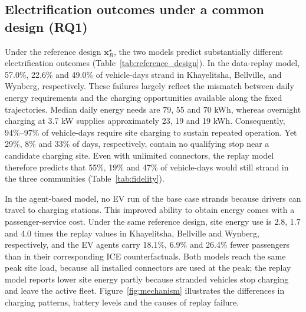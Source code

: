 \documentclass{elsarticle}
\newcommand{\xR}{\ensuremath{\mathbf{x}_R^{\star}}}
\begin{document}
\subsection{Electrification outcomes under a common design (RQ1)}
\label{sec:results_rq1}

Under the reference design \(\xR\), the two models predict substantially different electrification outcomes (Table~\ref{tab:reference_design}). In the data-replay model, 57.0\%, 22.6\% and 49.0\% of vehicle-days strand in Khayelitsha, Bellville, and Wynberg, respectively. These failures largely reflect the mismatch between daily energy requirements and the charging opportunities available along the fixed trajectories. Median daily energy needs are 79, 55 and 70 kWh, whereas overnight charging at 3.7 kW supplies approximately 23, 19 and 19 kWh. Consequently, 94\%--97\% of vehicle-days require site charging to sustain repeated operation. Yet 29\%, 8\% and 33\% of days, respectively, contain no qualifying stop near a candidate charging site. Even with unlimited connectors, the replay model therefore predicts that 55\%, 19\% and 47\% of vehicle-days would still strand in the three communities (Table~\ref{tab:fidelity}).

In the agent-based model, no EV run of the base case strands because drivers can travel to charging stations. This improved ability to obtain energy comes with a passenger-service cost. Under the same reference design, site energy use is 2.8, 1.7 and 4.0 times the replay values in Khayelitsha, Bellville and Wynberg, respectively, and the EV agents carry 18.1\%, 6.9\% and 26.4\% fewer passengers than in their corresponding ICE counterfactuals. Both models reach the same peak site load, because all installed connectors are used at the peak; the replay model reports lower site energy partly because stranded vehicles stop charging and leave the active fleet. Figure~\ref{fig:mechanism} illustrates the differences in charging patterns, battery levels and the causes of replay failure.
\end{document}
